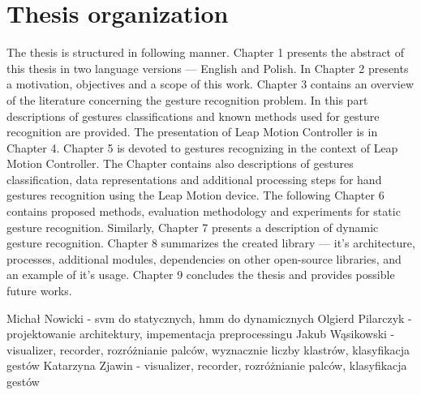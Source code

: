 \section{Thesis organization}
The thesis is structured in following manner. 
Chapter 1 presents the abstract of this thesis in two language versions --- English and Polish. 
In Chapter 2 presents a motivation, objectives and a scope of this work. 
Chapter 3 contains an overview of the literature concerning the gesture recognition problem. 
In this part descriptions of gestures classifications and known methods used for gesture recognition are provided. 
The presentation of Leap Motion Controller is in Chapter 4. Chapter 5 is devoted to gestures recognizing in the context of Leap Motion Controller.
The Chapter contains also descriptions of gestures classification, data representations and additional processing steps for hand gestures recognition using the Leap Motion device. 
The following Chapter 6 contains proposed methods, evaluation methodology and experiments for static gesture recognition. 
Similarly, Chapter 7 presents a description of dynamic gesture recognition. 
Chapter 8 summarizes the created library --- it's architecture, processes, additional modules, dependencies on other open-source libraries, and an example of it's usage. 
Chapter 9 concludes the thesis and provides possible future works. 

{\color{red} Michał Nowicki - svm do statycznych, hmm do dynamicznych
Olgierd Pilarczyk - projektowanie architektury, impementacja preprocessingu
Jakub Wąsikowski - visualizer, recorder, rozróżnianie palców, wyznacznie liczby klastrów, klasyfikacja gestów
Katarzyna Zjawin - visualizer, recorder, rozróżnianie palców, klasyfikacja gestów}


